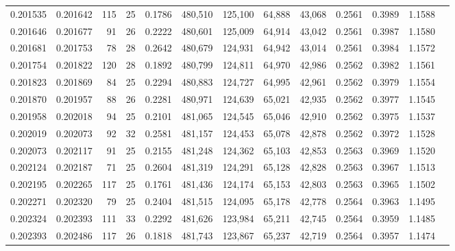 \begin{tabular}{rrrrrrrrrrrrr}
0.201535 & 0.201642 & 115 &  25 &                                     0.1786 & 480,510 & 125,100 &  64,888 &  43,068 & 0.2561 & 0.3989 & 1.1588 \\
0.201646 & 0.201677 &  91 &  26 &                                     0.2222 & 480,601 & 125,009 &  64,914 &  43,042 & 0.2561 & 0.3987 & 1.1580 \\
0.201681 & 0.201753 &  78 &  28 &                                     0.2642 & 480,679 & 124,931 &  64,942 &  43,014 & 0.2561 & 0.3984 & 1.1572 \\
0.201754 & 0.201822 & 120 &  28 &                                     0.1892 & 480,799 & 124,811 &  64,970 &  42,986 & 0.2562 & 0.3982 & 1.1561 \\
0.201823 & 0.201869 &  84 &  25 &                                     0.2294 & 480,883 & 124,727 &  64,995 &  42,961 & 0.2562 & 0.3979 & 1.1554 \\
0.201870 & 0.201957 &  88 &  26 &                                     0.2281 & 480,971 & 124,639 &  65,021 &  42,935 & 0.2562 & 0.3977 & 1.1545 \\
0.201958 & 0.202018 &  94 &  25 &                                     0.2101 & 481,065 & 124,545 &  65,046 &  42,910 & 0.2562 & 0.3975 & 1.1537 \\
0.202019 & 0.202073 &  92 &  32 &                                     0.2581 & 481,157 & 124,453 &  65,078 &  42,878 & 0.2562 & 0.3972 & 1.1528 \\
0.202073 & 0.202117 &  91 &  25 &                                     0.2155 & 481,248 & 124,362 &  65,103 &  42,853 & 0.2563 & 0.3969 & 1.1520 \\
0.202124 & 0.202187 &  71 &  25 &                                     0.2604 & 481,319 & 124,291 &  65,128 &  42,828 & 0.2563 & 0.3967 & 1.1513 \\
0.202195 & 0.202265 & 117 &  25 &                                     0.1761 & 481,436 & 124,174 &  65,153 &  42,803 & 0.2563 & 0.3965 & 1.1502 \\
0.202271 & 0.202320 &  79 &  25 &                                     0.2404 & 481,515 & 124,095 &  65,178 &  42,778 & 0.2564 & 0.3963 & 1.1495 \\
0.202324 & 0.202393 & 111 &  33 &                                     0.2292 & 481,626 & 123,984 &  65,211 &  42,745 & 0.2564 & 0.3959 & 1.1485 \\
0.202393 & 0.202486 & 117 &  26 &                                     0.1818 & 481,743 & 123,867 &  65,237 &  42,719 & 0.2564 & 0.3957 & 1.1474 \\

\end{tabular}
